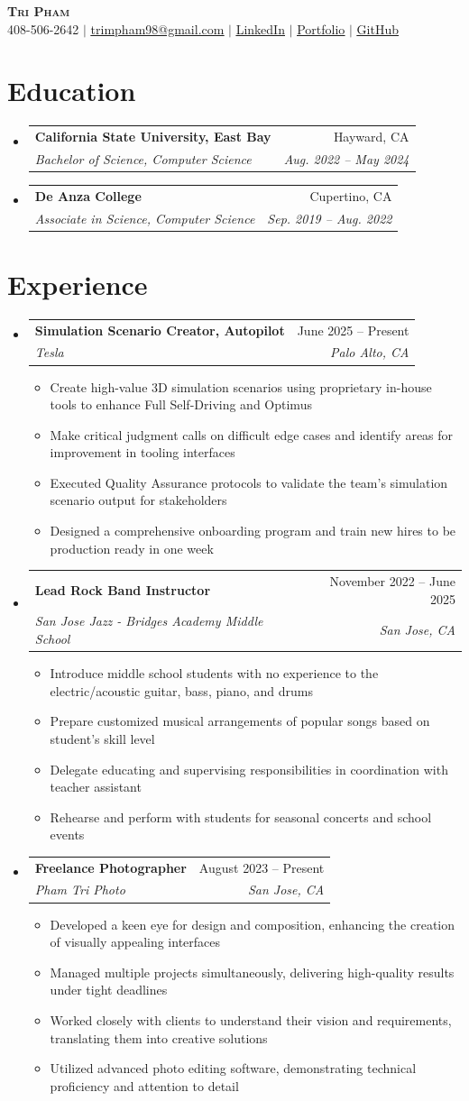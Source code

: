 \documentclass[letterpaper,11pt]{article}
\makeatletter
\newcommand{\resumeItem}[1]{
  \item\small{#1 \vspace{-2pt}}
}
\newcommand{\resumeSubheading}[4]{
  \vspace{-2pt}\item
    \begin{tabular*}{0.97\textwidth}[t]{l@{\extracolsep{\fill}}r}
      \textbf{#1} & #2 \\
      \textit{\small#3} & \textit{\small #4} \\
    \end{tabular*}\vspace{-7pt}
}
\newcommand{\resumeSubHeadingListStart}{\begin{itemize}[leftmargin=0.15in, label={}]}
\newcommand{\resumeSubHeadingListEnd}{\end{itemize}}
\newcommand{\resumeItemListStart}{\begin{itemize}[label=$\bullet$]}
\newcommand{\resumeItemListEnd}{\end{itemize}\vspace{-5pt}}
\makeatother
\begin{document}
\begin{center}
    \textbf{\Huge \scshape Tri Pham} \\ \vspace{1pt}
    \small 408-506-2642 $|$ \href{mailto:trimpham98@gmail.com}{\underline{trimpham98@gmail.com}} $|$
    \href{https://www.linkedin.com/in/pham-tri/}{\underline{LinkedIn}} $|$
    \href{https://www.trimpham.com/}{\underline{Portfolio}} $|$
    \href{https://github.com/TriMPham98}{\underline{GitHub}}

\end{center}
\section{Education}
  \resumeSubHeadingListStart
    \resumeSubheading
      {California State University, East Bay}{Hayward, CA}
      {Bachelor of Science, Computer Science}{Aug. 2022 -- May 2024}
    \resumeSubheading
      {De Anza College}{Cupertino, CA}
      {Associate in Science, Computer Science}{Sep. 2019 -- Aug. 2022}
  \resumeSubHeadingListEnd
\section{Experience}
  \resumeSubHeadingListStart
    \resumeSubheading
      {Simulation Scenario Creator, Autopilot}{June 2025 -- Present}
      {Tesla}{Palo Alto, CA}
      \resumeItemListStart
        \resumeItem{Create high-value 3D simulation scenarios using proprietary in-house tools to enhance Full Self-Driving and Optimus}
        \resumeItem{Make critical judgment calls on difficult edge cases and identify areas for improvement in tooling interfaces}
        \resumeItem{Executed Quality Assurance protocols to validate the team's simulation scenario output for stakeholders}
        \resumeItem{Designed a comprehensive onboarding program and train new hires to be production ready in one week}
      \resumeItemListEnd
    \resumeSubheading
      {Lead Rock Band Instructor}{November 2022 -- June 2025}
      {San Jose Jazz - Bridges Academy Middle School}{San Jose, CA}
      \resumeItemListStart
        \resumeItem{Introduce middle school students with no experience to the electric/acoustic guitar, bass, piano, and drums}
        \resumeItem{Prepare customized musical arrangements of popular songs based on student's skill level}
        \resumeItem{Delegate educating and supervising responsibilities in coordination with teacher assistant}
        \resumeItem{Rehearse and perform with students for seasonal concerts and school events}
      \resumeItemListEnd
    \resumeSubheading
      {Freelance Photographer}{August 2023 -- Present}
      {Pham Tri Photo}{San Jose, CA}
      \resumeItemListStart
        \resumeItem{Developed a keen eye for design and composition, enhancing the creation of visually appealing interfaces}
        \resumeItem{Managed multiple projects simultaneously, delivering high-quality results under tight deadlines}
        \resumeItem{Worked closely with clients to understand their vision and requirements, translating them into creative solutions}
        \resumeItem{Utilized advanced photo editing software, demonstrating technical proficiency and attention to detail}
      \resumeItemListEnd
  \resumeSubHeadingListEnd
\end{document}
